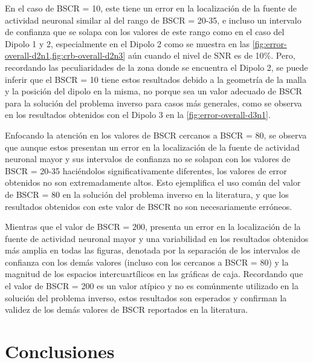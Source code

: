 En el caso de BSCR = 10, este tiene un error en la localización de la fuente de actividad neuronal similar al del rango de BSCR = 20-35, e incluso un intervalo de confianza que se solapa con los valores de este rango como en el caso del Dipolo 1 y 2, especialmente en el Dipolo 2 como se muestra en las \cref{fig:error-overall-d2n1,fig:crb-overall-d2n3} aún cuando el nivel de SNR es de 10\%.
Pero, recordando las peculiaridades de la zona donde se encuentra el Dipolo 2, se puede inferir que el BSCR = 10 tiene estos resultados debido a la geometría de la malla y la posición del dipolo en la misma, no porque sea un valor adecuado de BSCR para la solución del problema inverso para casos más generales, como se observa en los resultados obtenidos con el Dipolo 3 en la \cref{fig:error-overall-d3n1}.

Enfocando la atención en los valores de BSCR cercanos a BSCR = 80, se observa que aunque estos presentan un error en la localización de la fuente de actividad neuronal mayor y sus intervalos de confianza no se solapan con los valores de BSCR = 20-35 haciéndolos significativamente diferentes, los valores de error obtenidos no son extremadamente altos.
Esto ejemplifica el uso común del valor de BSCR = 80 en la solución del problema inverso en la literatura, y que los resultados obtenidos con este valor de BSCR no son necesariamente erróneos. 

Mientras que el valor de BSCR = 200, presenta un error en la localización de la fuente de actividad neuronal mayor y una variabilidad en los resultados obtenidos más amplia en todas las figuras, denotada por la separación de los intervalos de confianza con los demás valores (incluso con los cercanos a BSCR = 80) y la magnitud de los espacios intercuartílicos en las gráficas de caja.
Recordando que el valor de BSCR = 200 es un valor atípico y no es comúnmente utilizado en la solución del problema inverso, estos resultados son esperados y confirman la validez de los demás valores de BSCR reportados en la literatura. 

\section{Conclusiones}

